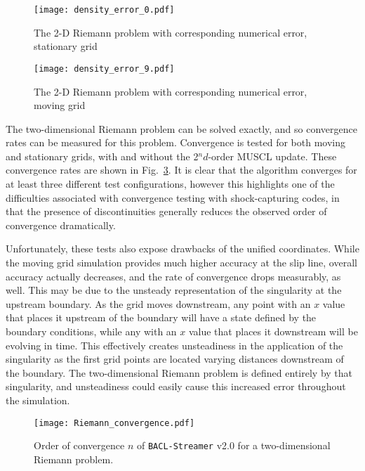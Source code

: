 \begin{figure}[p]
\centering
\texttt{[image: density\_error\_0.pdf]}
\caption{The 2-D Riemann problem with corresponding numerical error, stationary grid}
\label{fig:2.0-2d-riemann-density-0}
\end{figure}
\begin{figure}[p]
\centering
\texttt{[image: density\_error\_9.pdf]}
\caption{The 2-D Riemann problem with corresponding numerical error, moving grid}
\label{fig:2.0-2d-riemann-density-9}
\end{figure}

The two-dimensional Riemann problem can be solved exactly\cite{Toro1994}, and so convergence rates can be measured for this problem. Convergence is tested for both moving and stationary grids, with and without the 2$^nd$-order MUSCL update. These convergence rates are shown in Fig.~\ref{fig:2.0-2d-riemann-convergence}. It is clear that the algorithm converges for at least three different test configurations, however this highlights one of the difficulties associated with convergence testing with shock-capturing codes, in that the presence of discontinuities generally reduces the observed order of convergence dramatically.\cite{Sabac1997}\cite{Popov2006} 

Unfortunately, these tests also expose drawbacks of the unified coordinates. 
While the moving grid simulation provides much higher accuracy at the slip line, overall accuracy actually decreases, and the rate of convergence drops measurably, as well. This may be due to the unsteady representation of the singularity at the upstream boundary. As the grid moves downstream, any point with an $x$ value that places it upstream of the boundary will have a state defined by the boundary conditions, while any with an $x$ value that places it downstream will be evolving in time. This effectively creates unsteadiness in the application of the singularity as the first grid points are located varying distances downstream of the boundary. The two-dimensional Riemann problem is defined entirely by that singularity, and unsteadiness could easily cause this increased error throughout the simulation. 

\begin{figure}[p]
  \centering
  \texttt{[image: Riemann\_convergence.pdf]}
  \caption{Order of convergence $n$ of {\tt BACL-Streamer} v2.0 for a two-dimensional Riemann problem.}
  \label{fig:2.0-2d-riemann-convergence}
\end{figure}

